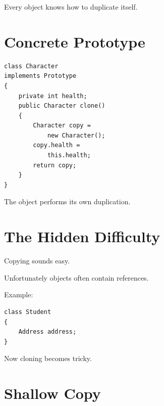 \documentclass[11pt,a4paper]{book}
\begin{document}

Every object knows how
to duplicate itself.


\section{Concrete Prototype}

\begin{verbatim}
class Character
implements Prototype
{
    private int health;
    public Character clone()
    {
        Character copy =
            new Character();
        copy.health =
            this.health;
        return copy;
    }
}
\end{verbatim}


The object performs its own
duplication.


\section{The Hidden Difficulty}

Copying sounds easy.


Unfortunately objects often
contain references.


Example:

\begin{verbatim}
class Student
{
    Address address;
}
\end{verbatim}


Now cloning becomes tricky.


\section{Shallow Copy}
\end{document}
